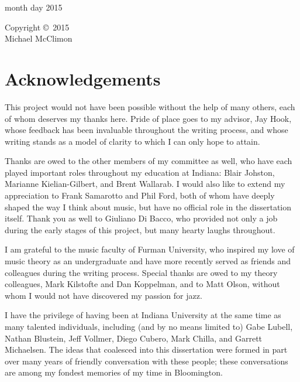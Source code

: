 {\flushleft
month day 2015
}

\clearpage

\begin{center}
  \vspace*{\fill}
  Copyright \copyright\ 2015 \\
  Michael McClimon
  \vspace*{\fill}
\end{center}
\clearpage


\section*{\Large Acknowledgements}

\doublespacing

This project would not have been possible without the help of many others,
each of whom deserves my thanks here. Pride of place goes to my advisor, Jay
Hook, whose feedback has been invaluable throughout the writing process, and
whose writing stands as a model of clarity to which I can only hope to attain.

Thanks are owed to the other members of my committee as well, who have each
played important roles throughout my education at Indiana: Blair Johston,
Marianne Kielian-Gilbert, and Brent Wallarab. I would also like to extend my
appreciation to Frank Samarotto and Phil Ford, both of whom have deeply shaped
the way I think about music, but have no official role in the dissertation
itself. Thank you as well to Giuliano Di Bacco, who provided not only a job
during the early stages of this project, but many hearty laughs throughout.

I am grateful to the music faculty of Furman University, who inspired my love
of music theory as an undergraduate and have more recently served as friends
and colleagues during the writing process. Special thanks are owed to my
theory colleagues, Mark Kilstofte and Dan Koppelman, and to Matt Olson,
without whom I would not have discovered my passion for jazz.

I have the privilege of having been at Indiana University at the same time as
many talented individuals, including (and by no means limited to) Gabe Lubell,
Nathan Blustein, Jeff Vollmer, Diego Cubero, Mark Chilla, and Garrett
Michaelsen. The ideas that coalesced into this dissertation were formed in
part over many years of friendly conversation with these people; these
conversations are among my fondest memories of my time in Bloomington.

